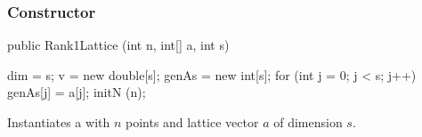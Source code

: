 \subsubsection*{Constructor}
\begin{code}

   public Rank1Lattice (int n, int[] a, int s) \begin{hide} {
      dim = s;
      v = new double[s];
      genAs = new int[s];
      for (int j = 0; j < s; j++) {
         genAs[j] = a[j];
      }
      initN (n);
   }\end{hide}
\end{code}
 \begin{tabb}
   Instantiates a  with $n$ points and lattice
   vector $a$ of dimension $s$.
 \end{tabb}
\begin{htmlonly}
\end{htmlonly}

